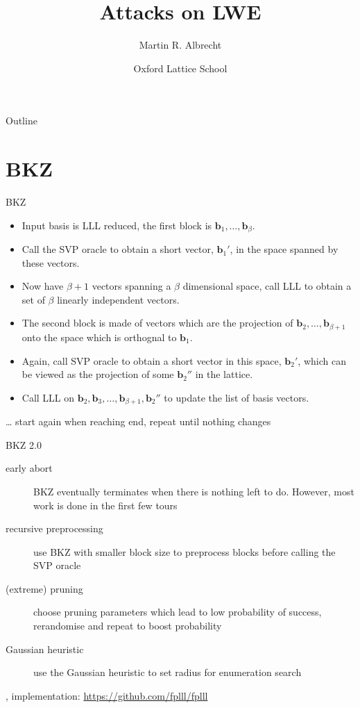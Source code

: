 \documentclass[presentation,smaller]{beamer}
\author{Martin R. Albrecht}
\date{Oxford Lattice School}
\title{Attacks on LWE}
\renewcommand{\vec}[1]{\mathbf{#1}\xspace}
\begin{document}
\maketitle
\begin{frame}{Outline}
\tableofcontents
\end{frame}


\section{BKZ}
\label{sec:orgcb8585b}
\begin{frame}[label={sec:org46c0130}]{BKZ}
\begin{itemize}
\item Input basis is LLL reduced, the \alert{first block} is \(\vec{b}_1,\dots,\vec{b}_{β}\).
\item Call the SVP oracle to obtain a short vector, \(\vec{b}_1'\), in the space spanned by these vectors.
\item Now have \(β+1\) vectors spanning a \(β\) dimensional space, call LLL to obtain a set of \(β\) linearly independent vectors.
\item The \alert{second block} is made of vectors which are the projection of \(\vec{b}_2,\dots, \vec{b}_{β+1}\) onto the space which is orthognal to \(\vec{b}_1\).
\item Again, call SVP oracle to obtain a short vector in this space, \(\vec{b}_2'\), which can be viewed as the projection of some \(\vec{b}_2''\) in the lattice.
\item Call LLL on \(\vec{b}_2, \vec{b}_3,\dots, \vec{b}_{β+1}, \vec{b}_2''\) to update the list of basis vectors.
\end{itemize}

… start again when reaching end, repeat until nothing changes
\end{frame}

\begin{frame}[label={sec:orga56eca6}]{BKZ 2.0}
\begin{description}
\item[{early abort}] BKZ eventually terminates when there is nothing left to do. However, most work is done in the first few tours
\item[{recursive preprocessing}] use BKZ with smaller block size to preprocess blocks before calling the SVP oracle
\item[{(extreme) pruning}] choose pruning parameters which lead to low probability of success, rerandomise and repeat to boost probability
\item[{Gaussian heuristic}] use the Gaussian heuristic to set radius for enumeration search
\end{description}

\begin{block}{}
, implementation: \url{https://github.com/fplll/fplll}
\end{block}
\end{frame}
\end{document}
